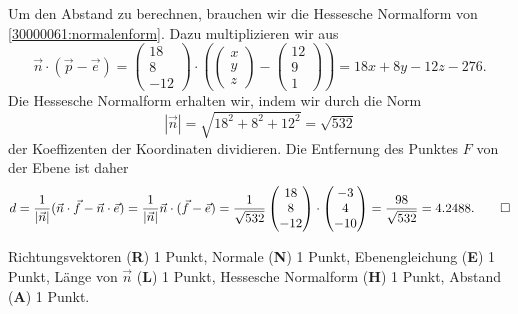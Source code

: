 \begin{loesung}
\begin{teilaufgaben}
\begin{equation}
\end{equation}
\item
Um den Abstand zu berechnen, brauchen wir die Hessesche Normalform
von \eqref{30000061:normalenform}.
Dazu multiplizieren wir aus
\[
\vec{n}\cdot (\vec{p}-\vec{e})
=
\begin{pmatrix} 18\\8\\-12 \end{pmatrix}
\cdot\left(
\begin{pmatrix}x\\y\\z\end{pmatrix}
-
\begin{pmatrix}12\\9\\1\end{pmatrix}
\right)
=
18x+8y-12z-276.
\]
Die Hessesche Normalform erhalten wir, indem wir durch die Norm
\[
|\vec{n}|
=
\sqrt{18^2+8^2+12^2}
=
\sqrt{532}
\]
der Koeffizenten der Koordinaten dividieren.
Die Entfernung des Punktes $F$ von der Ebene ist daher
\[
d
=
\frac{1}{|\vec{n}|}
(\vec{n}\cdot\vec{f}-\vec{n}\cdot\vec{e})
=
\frac{1}{|\vec{n}|}
\vec{n}\cdot(\vec{f}-\vec{e})
=
\frac1{\sqrt{532}}
\begin{pmatrix}18\\8\\-12\end{pmatrix}
\cdot
\begin{pmatrix}-3\\4\\-10\end{pmatrix}
=
\frac{98}{\sqrt{532}}
=
4.2488.
\qedhere
\]
\end{teilaufgaben}
\end{loesung}

\begin{bewertung}
Richtungsvektoren ({\bf R}) 1 Punkt,
Normale ({\bf N}) 1 Punkt,
Ebenengleichung ({\bf E}) 1 Punkt,
Länge von $\vec{n}$ ({\bf L}) 1 Punkt,
Hessesche Normalform ({\bf H}) 1 Punkt,
Abstand ({\bf A}) 1 Punkt.
\end{bewertung}


